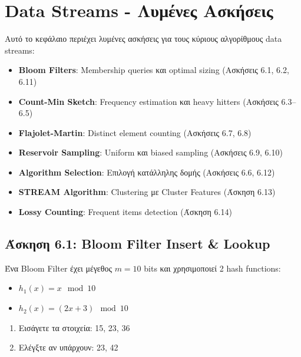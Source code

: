 
\chapter{Data Streams - Λυμένες Ασκήσεις}
\label{ch:data-streams-exercises}

Αυτό το κεφάλαιο περιέχει λυμένες ασκήσεις για τους κύριους αλγορίθμους data streams:
\begin{itemize}
    \item \textbf{Bloom Filters}: Membership queries και optimal sizing (Ασκήσεις 6.1, 6.2, 6.11)
    \item \textbf{Count-Min Sketch}: Frequency estimation και heavy hitters (Ασκήσεις 6.3--6.5)
    \item \textbf{Flajolet-Martin}: Distinct element counting (Ασκήσεις 6.7, 6.8)
    \item \textbf{Reservoir Sampling}: Uniform και biased sampling (Ασκήσεις 6.9, 6.10)
    \item \textbf{Algorithm Selection}: Επιλογή κατάλληλης δομής (Ασκήσεις 6.6, 6.12)
    \item \textbf{STREAM Algorithm}: Clustering με Cluster Features (Άσκηση 6.13)
    \item \textbf{Lossy Counting}: Frequent items detection (Άσκηση 6.14)
\end{itemize}

\section{Άσκηση 6.1: Bloom Filter Insert \& Lookup}

\begin{formulabox}[Εκφώνηση]
Ένα Bloom Filter έχει μέγεθος $m = 10$ bits και χρησιμοποιεί 2 hash functions:
\begin{itemize}
    \item $h_1(x) = x \mod 10$
    \item $h_2(x) = (2x + 3) \mod 10$
\end{itemize}

\begin{enumerate}
    \item Εισάγετε τα στοιχεία: 15, 23, 36
    \item Ελέγξτε αν υπάρχουν: 23, 42
\end{enumerate}
\end{formulabox}

